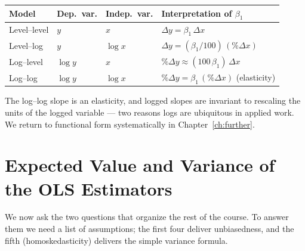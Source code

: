 \begin{center}
\renewcommand{\arraystretch}{1.6}
\begin{tabular}{@{}llll@{}}
\toprule
Model & Dep.\ var. & Indep.\ var. & Interpretation of $\beta_1$ \\
\midrule
Level--level & $y$       & $x$       & $\Delta y = \beta_1\,\Delta x$ \\
Level--log   & $y$       & $\log x$  & $\Delta y = (\beta_1/100)\,(\%\Delta x)$ \\
Log--level   & $\log y$  & $x$       & $\%\Delta y \approx (100\,\beta_1)\,\Delta x$ \\
Log--log     & $\log y$  & $\log x$  & $\%\Delta y = \beta_1\,(\%\Delta x)$ \quad (elasticity) \\
\bottomrule
\end{tabular}
\end{center}

The log--log slope is an elasticity, and logged slopes are invariant to rescaling the units of the logged variable --- two reasons logs are ubiquitous in applied work. We return to functional form systematically in Chapter~\ref{ch:further}.

\section{Expected Value and Variance of the OLS Estimators}

We now ask the two questions that organize the rest of the course. To answer them we need a list of assumptions; the first four deliver unbiasedness, and the fifth (homoskedasticity) delivers the simple variance formula.


